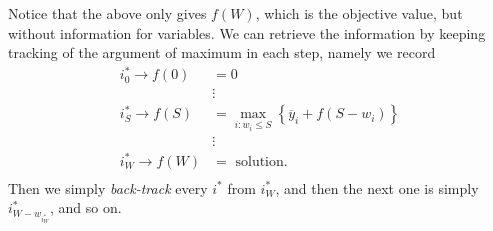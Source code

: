 \begin{answer}
\begin{itemize}
		      Notice that the above only gives \(f(W)\), which is the objective value, but without information for variables. We can retrieve the information by keeping tracking of the argument of maximum in each step, namely we record
		      \[
			      \begin{split}
				      i^{\ast}_{0 }\to f(0) &= 0\\
				      &\vdots\\
				      i^{\ast}_S \to f(S) &= \max_{i\colon w_{i}\leq S}\left\{ \overline{y}_{i} + f(S - w_{i})\right\}\\
				      &\vdots\\
				      i^{\ast}_W \to f(W) &= \text{ solution}.\\
			      \end{split}
		      \]
		      Then we simply \emph{back-track} every \(i^{\ast}\) from \(i^{\ast}_W\), and then the next one is simply \(i^{\ast}_{W - w_{i^{\ast}_W}}\), and so on.
	\end{itemize}
\end{answer}